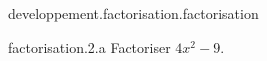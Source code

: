 \begin{qcm}{developpement.factorisation.factorisation}
    \begin{question}{factorisation.2.a}
         Factoriser \(4x^2-9\).
         \vspace{-1.5ex}
         \begin{multicols}{2}
         \begin{reponses}
         \end{reponses}
         \end{multicols}
    \end{question}
\end{qcm}
